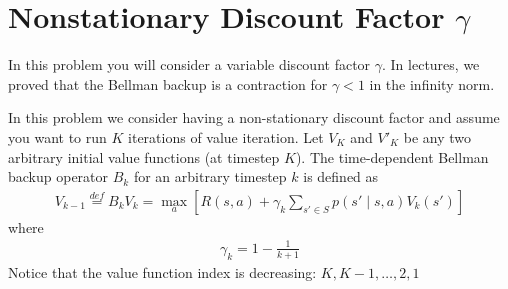\section{Nonstationary Discount Factor $\gamma$}

In this problem you will consider a variable discount factor $\gamma$. In lectures, we proved that the Bellman backup is a contraction for $\gamma < 1$ in the infinity norm. 

In this problem we consider having a non-stationary discount factor and assume you want to run $K$ iterations of value iteration. Let $V_K$ and $V'_K$ be any two arbitrary initial value functions (at timestep $K$).
The time-dependent Bellman backup operator $B_k$ for an arbitrary timestep $k$ is defined as
\begin{align}
    V_{k-1} \overset{def}{=} B_{k}V_{k} = \max_{a}[ R(s, a) + \gamma_{k}\sum_{s' \in S}p(s' \mid s,a)V_{k}(s')]
\end{align}
where
\begin{align}
    \gamma_{k} = 1 - \frac{1}{k+1}
\end{align}
Notice that the value function index is decreasing: $K,K-1,\dots,2,1$

\begin{enumerate}[(a)]

	

	

	

\end{enumerate}
